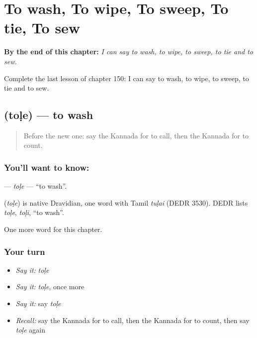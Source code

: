 
\chapter{To wash, To wipe, To sweep, To tie, To sew}
\label{ch:ka-to-wash-to-wipe-to-sweep-to-tie-to-sew}

\begin{chapteropening}
\textbf{By the end of this chapter:} \emph{I can say to wash, to wipe, to sweep, to tie and to sew.}

Complete the last lesson of chapter 150: I can say to wash, to wipe, to sweep, to tie and to sew.
\end{chapteropening}

\section[\texorpdfstring{\kn{ತೊಳೆ} (toḷe)}{ತೊಳೆ (toḷe)}]{ (toḷe) — to wash}

\label{lesson:KA-C150-tole}



\begin{quote}
Before the new one: say the Kannada for to call, then the Kannada for to count.
\end{quote}

\subsection*{You'll want to know: }
\textbf{} — \emph{toḷe} — \textquotedblleft{}to wash\textquotedblright{}.

\begin{cousinweb}
\textbf{} (\emph{toḷe}) is native Dravidian, one word with Tamil \emph{tuḷai} (DEDR 3530). DEDR lists \emph{toḷe}, \emph{toḷi}, \textquotedblleft{}to wash\textquotedblright{}.
\end{cousinweb}

\begin{grammarlens}[title={What you've built}]
One more word for this chapter.
\end{grammarlens}

\subsection*{Your turn}
\begin{itemize}
\raggedright
  \item \emph{Say it:} \emph{toḷe}
  \item \emph{Say it:} \emph{toḷe}, once more
  \item \emph{Say it:} say \emph{toḷe}
  \item \emph{Recall:} say the Kannada for to call, then the Kannada for to count, then say \emph{toḷe} again
\end{itemize}

